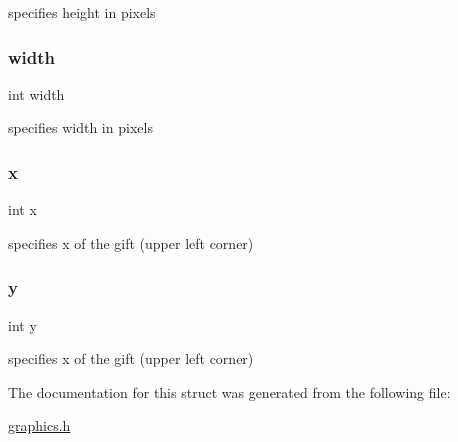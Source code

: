 specifies height in pixels 

\mbox{\label{struct_gift_a2474a5474cbff19523a51eb1de01cda4}} 
\subsubsection{\texorpdfstring{width}{width}}
{\footnotesize\ttfamily int width}



specifies width in pixels 

\mbox{\label{struct_gift_a6150e0515f7202e2fb518f7206ed97dc}} 
\subsubsection{\texorpdfstring{x}{x}}
{\footnotesize\ttfamily int x}



specifies x of the gift (upper left corner) 

\mbox{\label{struct_gift_a0a2f84ed7838f07779ae24c5a9086d33}} 
\subsubsection{\texorpdfstring{y}{y}}
{\footnotesize\ttfamily int y}



specifies x of the gift (upper left corner) 



The documentation for this struct was generated from the following file\+:\begin{DoxyCompactItemize}
\item 
\hyperlink{graphics_8h}{graphics.\+h}\end{DoxyCompactItemize}
